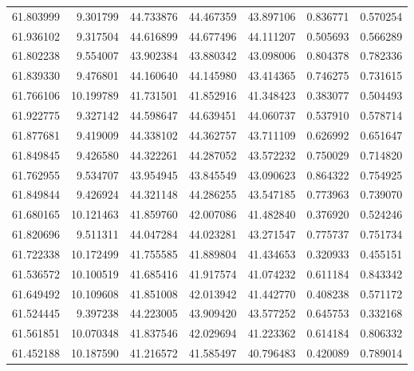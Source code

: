 \begin{tabular}{rrrrrrr}
 61.803999 &   9.301799 &         44.733876 &         44.467359 &         43.897106 &  0.836771 &  0.570254 \\
 61.936102 &   9.317504 &         44.616899 &         44.677496 &         44.111207 &  0.505693 &  0.566289 \\
 61.802238 &   9.554007 &         43.902384 &         43.880342 &         43.098006 &  0.804378 &  0.782336 \\
 61.839330 &   9.476801 &         44.160640 &         44.145980 &         43.414365 &  0.746275 &  0.731615 \\
 61.766106 &  10.199789 &         41.731501 &         41.852916 &         41.348423 &  0.383077 &  0.504493 \\
 61.922775 &   9.327142 &         44.598647 &         44.639451 &         44.060737 &  0.537910 &  0.578714 \\
 61.877681 &   9.419009 &         44.338102 &         44.362757 &         43.711109 &  0.626992 &  0.651647 \\
 61.849845 &   9.426580 &         44.322261 &         44.287052 &         43.572232 &  0.750029 &  0.714820 \\
 61.762955 &   9.534707 &         43.954945 &         43.845549 &         43.090623 &  0.864322 &  0.754925 \\
 61.849844 &   9.426924 &         44.321148 &         44.286255 &         43.547185 &  0.773963 &  0.739070 \\
 61.680165 &  10.121463 &         41.859760 &         42.007086 &         41.482840 &  0.376920 &  0.524246 \\
 61.820696 &   9.511311 &         44.047284 &         44.023281 &         43.271547 &  0.775737 &  0.751734 \\
 61.722338 &  10.172499 &         41.755585 &         41.889804 &         41.434653 &  0.320933 &  0.455151 \\
 61.536572 &  10.100519 &         41.685416 &         41.917574 &         41.074232 &  0.611184 &  0.843342 \\
 61.649492 &  10.109608 &         41.851008 &         42.013942 &         41.442770 &  0.408238 &  0.571172 \\
 61.524445 &   9.397238 &         44.223005 &         43.909420 &         43.577252 &  0.645753 &  0.332168 \\
 61.561851 &  10.070348 &         41.837546 &         42.029694 &         41.223362 &  0.614184 &  0.806332 \\
 61.452188 &  10.187590 &         41.216572 &         41.585497 &         40.796483 &  0.420089 &  0.789014 \\

\end{tabular}
